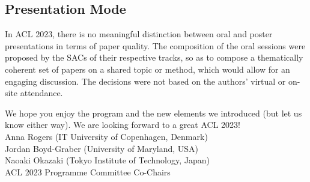 
\subsection*{Presentation Mode}

In ACL 2023, there is no meaningful distinction between oral and poster presentations in terms of paper quality. The composition of the oral sessions were proposed by the SACs of their respective tracks, so as to compose a thematically coherent set of papers on a shared topic or method, which would allow for an engaging discussion. The decisions were not based on the authors' virtual or on-site attendance.


We hope you enjoy the program and the new elements we introduced (but let us know either way). We are looking forward to a great ACL 2023! \vspace{3ex}\\ 
Anna Rogers (IT University of Copenhagen, Denmark)\\
Jordan Boyd-Graber (University of Maryland, USA)\\
Naoaki Okazaki (Tokyo Institute of Technology, Japan)\\ 
ACL 2023 Programme Committee Co-Chairs